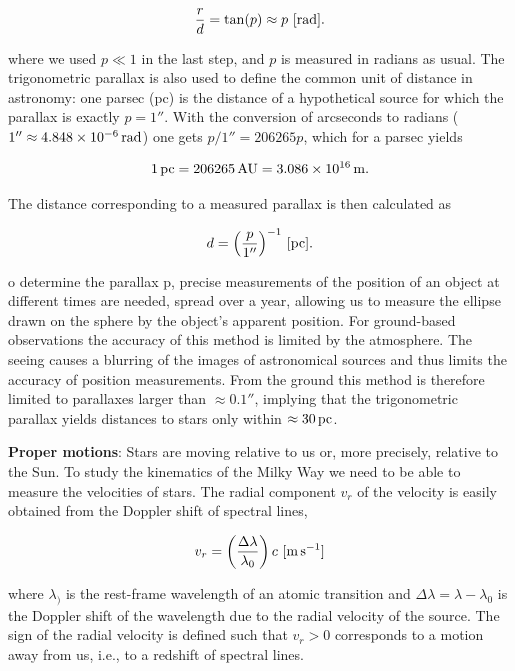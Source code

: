 \documentclass[a4paper,11pt]{article}
\begin{document}
\begin{align*}
    \frac{r}{d} = \tan(p) \approx p ~ [{\rm rad}].
\end{align*}

{\noindent}where we used $p\ll1$ in the last step, and $p$ is measured in radians as usual. The trigonometric parallax is also used to define the common unit of distance in astronomy: one parsec (pc) is the distance of a hypothetical source for which the parallax is exactly $p=1''$. With the conversion of arcseconds to radians ($1''\approx4.848\times10^{-6}\,{\rm rad}$) one gets $p/1''=206265p$, which for a parsec yields

\begin{align*}
    1\,{\rm pc} = 206265\,{\rm AU} = 3.086\times10^{16}\,{\rm m}.
\end{align*}

{\noindent}The distance corresponding to a measured parallax is then
calculated as

\begin{align*}
    d = \left(\frac{p}{1''}\right)^{-1}\,{[\rm pc]}.
\end{align*}

{\noindent}o determine the parallax p, precise measurements of the position of an object at different times are needed, spread over a year, allowing us to measure the ellipse drawn on the sphere by the object’s apparent position. For ground-based observations the accuracy of this method is limited by the atmosphere. The seeing causes a blurring of the images of astronomical sources and thus limits the accuracy of position measurements. From the ground this method is therefore limited to parallaxes larger than $\approx0.1''$, implying that the trigonometric parallax yields distances to stars only within $\approx30\,{\rm pc}$.

{\noindent}\textbf{Proper motions}: Stars are moving relative to us or, more precisely, relative to the Sun. To study the kinematics of the Milky Way we need to be able to measure the velocities of stars. The radial component $v_r$ of the velocity is easily obtained from the Doppler shift of spectral lines,

\begin{align*}
    v_r = \left(\frac{\Delta\lambda}{\lambda_0}\right)c ~ [{\rm m\,s^{-1}}]
\end{align*}

{\noindent}where $\lambda_)$ is the rest-frame wavelength of an atomic transition and $\Delta\lambda=\lambda-\lambda_0$ is the Doppler shift of the wavelength due to the radial velocity of the source. The sign of the radial velocity is defined such that $v_r>0$ corresponds to a motion away from us, i.e., to a redshift of spectral lines.
\end{document}
